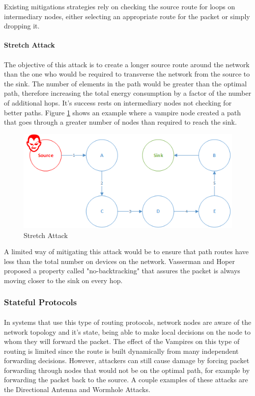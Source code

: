 Existing mitigations strategies rely on checking the source route for loops on intermediary nodes, either selecting an appropriate route for the packet or simply dropping it.

\paragraph{\textbf{Stretch Attack}}
\paragraph{}
The objective of this attack is to create a longer source route around the network than the one who would be required to transverse the network from the source to the sink. The number of elements in the path would be greater than the optimal path, therefore increasing the total energy consumption by a factor of the number of additional hops. It's success rests on intermediary nodes not checking for better paths. Figure \ref{fig:stretch_attack} shows an example where a vampire node created a path that goes through a greater number of nodes than required to reach the sink.

\begin{figure}[h]
  \centering
  \includegraphics[width=0.8\linewidth]{figures/Stretch_Attack.png}
  \caption{Stretch Attack}
  \label{fig:stretch_attack}
\end{figure}

A limited way of mitigating this attack would be to ensure that path routes have less than the total number on devices on the network. Vasserman and Hoper proposed a property called "no-backtracking" that assures the packet is always moving closer to the sink on every hop. \cite{Vasserman2013}

\subsubsection{Stateful Protocols}
\paragraph{}
In systems that use this type of routing protocols, network nodes are aware of the network topology and it's state, being able to make local decisions on the node to whom they will forward the packet. The effect of the Vampires on this type of routing is limited since the route is built dynamically from many independent forwarding decisions. However, attackers can still cause damage by forcing packet forwarding through nodes that would not be on the optimal path, for example by forwarding the packet back to the source. A couple examples of these attacks are the Directional Antenna and Wormhole Attacks.

